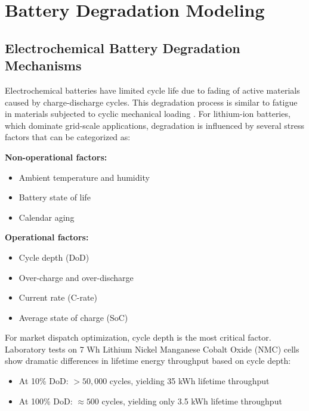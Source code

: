 \documentclass[10pt,twocolumn]{article}
\begin{document}

\section{Battery Degradation Modeling}

\subsection{Electrochemical Battery Degradation Mechanisms}

Electrochemical batteries have limited cycle life due to fading of active materials caused by charge-discharge cycles. This degradation process is similar to fatigue in materials subjected to cyclic mechanical loading \cite{xu2017factoring}. For lithium-ion batteries, which dominate grid-scale applications, degradation is influenced by several stress factors that can be categorized as:

\textbf{Non-operational factors:}
\begin{itemize}
\item Ambient temperature and humidity
\item Battery state of life
\item Calendar aging
\end{itemize}

\textbf{Operational factors:}
\begin{itemize}
\item Cycle depth (DoD)
\item Over-charge and over-discharge
\item Current rate (C-rate)
\item Average state of charge (SoC)
\end{itemize}

For market dispatch optimization, cycle depth is the most critical factor. Laboratory tests on 7 Wh Lithium Nickel Manganese Cobalt Oxide (NMC) cells show dramatic differences in lifetime energy throughput based on cycle depth:
\begin{itemize}
\item At 10\% DoD: $>50,000$ cycles, yielding 35 kWh lifetime throughput
\item At 100\% DoD: $\approx 500$ cycles, yielding only 3.5 kWh lifetime throughput
\end{itemize}
\end{document}
